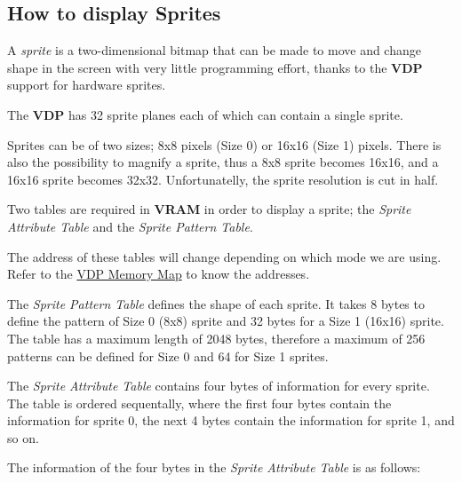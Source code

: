     \subsection{How to display Sprites}
    
    A \textit{sprite} is a two-dimensional bitmap that can be made to move
    and change shape in the screen with very little programming effort, thanks
    to the \textbf{VDP} support for hardware sprites.

    The \textbf{VDP} has 32 sprite planes each of which can contain a single
    sprite.

    Sprites can be of two sizes; 8x8 pixels (Size 0) or 16x16 (Size 1) pixels.
    There is also the possibility to magnify a sprite, thus a 8x8 sprite becomes
    16x16, and a 16x16 sprite becomes 32x32. Unfortunatelly, the sprite
    resolution is cut in half.

    Two tables are required in \textbf{VRAM} in order to display a sprite; the 
    \textit{Sprite Attribute Table} and the \textit{Sprite Pattern Table}.

    The address of these tables will change depending on which mode we are using.
    Refer to the \hyperref[subsec:vdp_memmap]{VDP Memory Map} to know the addresses.

    The \textit{Sprite Pattern Table} defines the shape of each sprite. It takes
    8 bytes to define the pattern of Size 0 (8x8) sprite and 32 bytes for a Size
    1 (16x16) sprite. The table has a maximum length of 2048 bytes, therefore a
    maximum of 256 patterns can be defined for Size 0 and 64 for Size 1 sprites.

    The \textit{Sprite Attribute Table} contains four bytes of information for
    every sprite. The table is ordered sequentally, where the first four bytes
    contain the information for sprite 0, the next 4 bytes contain the
    information for sprite 1, and so on.

    The information of the four bytes in the \textit{Sprite Attribute Table} is
    as follows:

